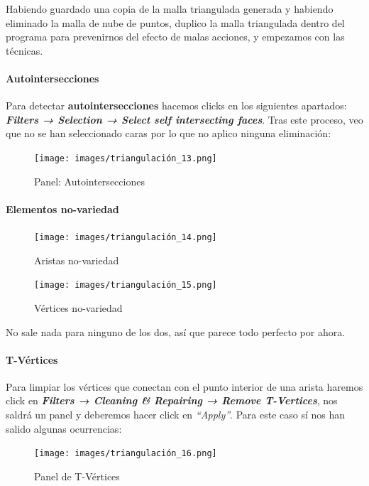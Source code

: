 \documentclass[options]{article}
\begin{document}
Habiendo guardado una copia de la malla triangulada generada y habiendo eliminado la malla de nube de puntos, duplico la malla triangulada dentro del programa para prevenirnos del efecto de malas acciones, y empezamos con las técnicas.

\pagebreak 

\paragraph{Autointersecciones}
Para detectar \textbf{autointersecciones} hacemos clicks en los siguientes apartados: \textbf{\textit{Filters → Selection → Select self intersecting faces}}. Tras este proceso, veo que no se han seleccionado caras por lo que no aplico ninguna eliminación:

\begin{figure}[H]
    \centering 
    \texttt{[image: images/triangulación\_13.png]} \\
    \caption{Panel: Autointersecciones}
\end{figure}

\paragraph{Elementos no-variedad}

\begin{figure}[H]
    \centering
    \texttt{[image: images/triangulación\_14.png]}
    \caption{Aristas no-variedad}
\end{figure}

\begin{figure}[H]
    \centering
    \texttt{[image: images/triangulación\_15.png]}    
    \caption{Vértices no-variedad}
\end{figure}

No sale nada para ninguno de los dos, así que parece todo perfecto por ahora.

\paragraph{T-Vértices}

Para limpiar los vértices que conectan con el punto interior de una arista haremos click en \textbf{\textit{Filters → Cleaning \& Repairing → Remove T-Vertices}}, nos saldrá un panel y deberemos hacer click en \textit{``Apply''}. Para este caso sí nos han salido algunas ocurrencias:


\begin{figure}[H]
    \centering
    \texttt{[image: images/triangulación\_16.png]}
    \caption{Panel de T-Vértices}
\end{figure}
\end{document}
